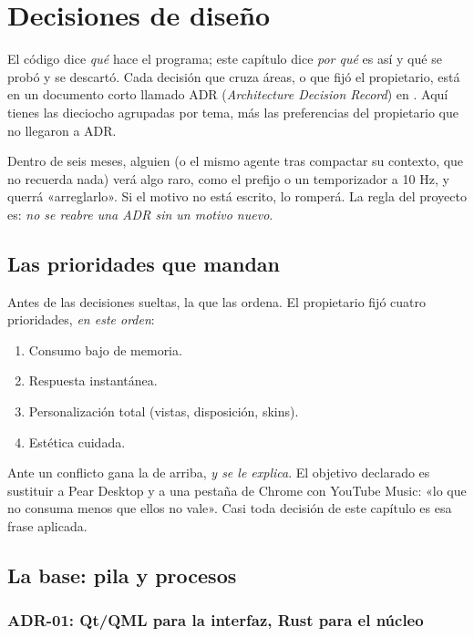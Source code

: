 \chapter{Decisiones de diseño}
\label{cap:decisiones}

El código dice \emph{qué} hace el programa; este capítulo dice \emph{por qué} es así y qué se
probó y se descartó. Cada decisión que cruza áreas, o que fijó el propietario, está en un
documento corto llamado ADR (\emph{Architecture Decision Record}) en
. Aquí tienes las dieciocho agrupadas por tema, más las preferencias
del propietario que no llegaron a ADR.

\begin{idea}
Dentro de seis meses, alguien (o el mismo agente tras compactar su contexto, que no recuerda
nada) verá algo raro, como el prefijo  o un temporizador a 10 Hz, y querrá
«arreglarlo». Si el motivo no está escrito, lo romperá. La regla del proyecto es:
\emph{no se reabre una ADR sin un motivo nuevo}.
\end{idea}

\section{Las prioridades que mandan}

Antes de las decisiones sueltas, la que las ordena. El propietario fijó cuatro prioridades,
\emph{en este orden}:

\begin{enumerate}
  \item Consumo bajo de memoria.
  \item Respuesta instantánea.
  \item Personalización total (vistas, disposición, skins).
  \item Estética cuidada.
\end{enumerate}

Ante un conflicto gana la de arriba, \emph{y se le explica}. El objetivo declarado es
sustituir a Pear Desktop y a una pestaña de Chrome con YouTube Music: «lo que no consuma
menos que ellos no vale». Casi toda decisión de este capítulo es esa frase aplicada.

\section{La base: pila y procesos}

\subsection{ADR-01: Qt/QML para la interfaz, Rust para el núcleo}

